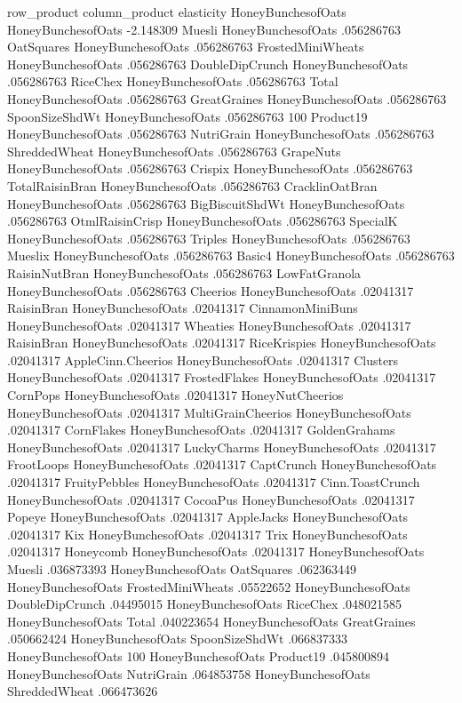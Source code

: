 row_product	column_product	elasticity
HoneyBunchesofOats	HoneyBunchesofOats	-2.148309
Muesli	HoneyBunchesofOats	.056286763
OatSquares	HoneyBunchesofOats	.056286763
FrostedMiniWheats	HoneyBunchesofOats	.056286763
DoubleDipCrunch	HoneyBunchesofOats	.056286763
RiceChex	HoneyBunchesofOats	.056286763
Total	HoneyBunchesofOats	.056286763
GreatGraines	HoneyBunchesofOats	.056286763
SpoonSizeShdWt	HoneyBunchesofOats	.056286763
100%
Product19	HoneyBunchesofOats	.056286763
NutriGrain	HoneyBunchesofOats	.056286763
ShreddedWheat	HoneyBunchesofOats	.056286763
GrapeNuts	HoneyBunchesofOats	.056286763
Crispix	HoneyBunchesofOats	.056286763
TotalRaisinBran	HoneyBunchesofOats	.056286763
CracklinOatBran	HoneyBunchesofOats	.056286763
BigBiscuitShdWt	HoneyBunchesofOats	.056286763
OtmlRaisinCrisp	HoneyBunchesofOats	.056286763
SpecialK	HoneyBunchesofOats	.056286763
Triples	HoneyBunchesofOats	.056286763
Mueslix	HoneyBunchesofOats	.056286763
Basic4	HoneyBunchesofOats	.056286763
RaisinNutBran	HoneyBunchesofOats	.056286763
LowFatGranola	HoneyBunchesofOats	.056286763
Cheerios	HoneyBunchesofOats	.02041317
RaisinBran	HoneyBunchesofOats	.02041317
CinnamonMiniBuns	HoneyBunchesofOats	.02041317
Wheaties	HoneyBunchesofOats	.02041317
RaisinBran	HoneyBunchesofOats	.02041317
RiceKrispies	HoneyBunchesofOats	.02041317
AppleCinn.Cheerios	HoneyBunchesofOats	.02041317
Clusters	HoneyBunchesofOats	.02041317
FrostedFlakes	HoneyBunchesofOats	.02041317
CornPops	HoneyBunchesofOats	.02041317
HoneyNutCheerios	HoneyBunchesofOats	.02041317
MultiGrainCheerios	HoneyBunchesofOats	.02041317
CornFlakes	HoneyBunchesofOats	.02041317
GoldenGrahams	HoneyBunchesofOats	.02041317
LuckyCharms	HoneyBunchesofOats	.02041317
FrootLoops	HoneyBunchesofOats	.02041317
CaptCrunch	HoneyBunchesofOats	.02041317
FruityPebbles	HoneyBunchesofOats	.02041317
Cinn.ToastCrunch	HoneyBunchesofOats	.02041317
CocoaPus	HoneyBunchesofOats	.02041317
Popeye	HoneyBunchesofOats	.02041317
AppleJacks	HoneyBunchesofOats	.02041317
Kix	HoneyBunchesofOats	.02041317
Trix	HoneyBunchesofOats	.02041317
Honeycomb	HoneyBunchesofOats	.02041317
HoneyBunchesofOats	Muesli	.036873393
HoneyBunchesofOats	OatSquares	.062363449
HoneyBunchesofOats	FrostedMiniWheats	.05522652
HoneyBunchesofOats	DoubleDipCrunch	.04495015
HoneyBunchesofOats	RiceChex	.048021585
HoneyBunchesofOats	Total	.040223654
HoneyBunchesofOats	GreatGraines	.050662424
HoneyBunchesofOats	SpoonSizeShdWt	.066837333
HoneyBunchesofOats	100%
HoneyBunchesofOats	Product19	.045800894
HoneyBunchesofOats	NutriGrain	.064853758
HoneyBunchesofOats	ShreddedWheat	.066473626
